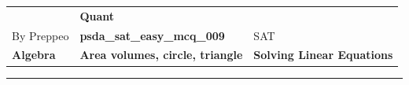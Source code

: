 \documentclass[11pt,paper=a4,answers]{exam}
\begin{document}
\begin{center}
    \centering
    \renewcommand{\arraystretch}{1.5}
    \begin{tabularx}{\textwidth}{YYY}
    & \normalsize\bf{{\Large{{Quant}}}} & \\
    By Preppeo & \normalsize\bf{{psda\_sat\_easy\_mcq\_009}} & SAT\\
    \normalsize{{\textbf{{Algebra}} }} & \normalsize{{\textbf{{Area volumes, circle, triangle }} }} & \normalsize{{\textbf{{Solving Linear Equations}} }} \\
    \end{tabularx}
\end{center}
\par\noindent\rule{\textwidth}{1pt}
\end{document}
